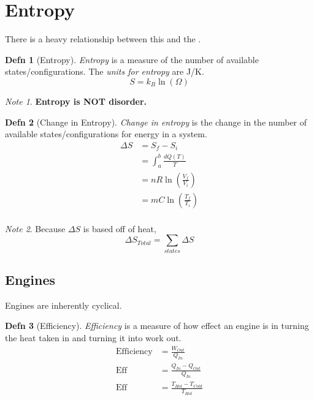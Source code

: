 \documentclass[10pt,letterpaper,final,twoside,notitlepage]{article}
\numberwithin{equation}{section} %
\theoremstyle{definition}
\newtheorem{definition}{Defn} %
\theoremstyle{remark}
\newtheorem{note}{Note}[definition] %
\begin{document}
\section{Entropy} \label{sec:Entropy}
There is a heavy relationship between this and the .
	\begin{definition}[Entropy] \label{def:Entropy}
		\emph{Entropy} is a measure of the number of available states/configurations.
		The \emph{units for entropy} are \si{\joule / \kelvin}.
		\begin{equation} \label{eq:Entropy}
			S = k_{B} \ln \left( \Omega \right)
		\end{equation}
		\begin{note}
			\textbf{Entropy is NOT disorder.}
		\end{note}
	\end{definition}
	\begin{definition}[Change in Entropy] \label{def:Change in Entropy}
		\emph{Change in entropy} is the change in the number of available states/configurations for energy in a system.
		\begin{equation} \label{eq:Change in Entropy}
			\begin{aligned}
				\Delta S &= S_{f} - S_{i} \\
						 &= \int_{a}^{b} \frac{dQ \left( T \right)}{T} \\
						 &= nR \ln \left( \frac{V_{f}}{V_{i}} \right) \\
						 &= mC \ln \left( \frac{T_{f}}{T_{i}} \right) \\
			\end{aligned}
		\end{equation}
		\begin{note}
			Because $\Delta S$ is based off of heat,
			\begin{equation}
				\Delta S_{Total} = \sum_{states} \Delta S
			\end{equation}
		\end{note}
	\end{definition}

	\subsection{Engines} \label{subsec:Engines}
	Engines are inherently cyclical.
		\begin{definition}[Efficiency] \label{def:Efficiency}
			\emph{Efficiency} is a measure of how effect an engine is in turning the heat taken in and turning it into work out.
			\begin{equation} \label{eq:Efficiency}
				\begin{aligned}
					\text{Efficiency} &= \frac{W_{Out}}{Q_{In}} \\
					\text{Eff} &= \frac{Q_{In}-Q_{Out}}{Q_{In}} \\
					\text{Eff} &= \frac{T_{Hot}-T_{Cold}}{T_{Hot}} \\
				\end{aligned}
			\end{equation}
		\end{definition}
	
\end{document}
